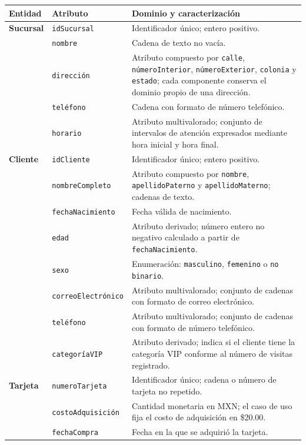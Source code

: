 \begin{center}
\footnotesize
\renewcommand{\arraystretch}{0.8}
\begin{tabularx}{\textwidth}{@{}>{\bfseries\color{unamblue}}p{}p{}X@{}}
\toprule
Entidad & Atributo & Dominio y caracterización \\
\midrule
Sucursal & \texttt{idSucursal} & Identificador único; entero positivo. \\
 & \texttt{nombre} & Cadena de texto no vacía. \\
 & \texttt{dirección} & Atributo compuesto por \texttt{calle},
   \texttt{númeroInterior}, \texttt{númeroExterior}, \texttt{colonia} y
   \texttt{estado}; cada componente conserva el dominio propio de una
   dirección. \\
 & \texttt{teléfono} & Cadena con formato de número telefónico. \\
 & \texttt{horario} & Atributo multivalorado; conjunto de intervalos de atención
   expresados mediante hora inicial y hora final. \\
\midrule
Cliente & \texttt{idCliente} & Identificador único; entero positivo. \\
 & \texttt{nombreCompleto} & Atributo compuesto por \texttt{nombre},
   \texttt{apellidoPaterno} y \texttt{apellidoMaterno}; cadenas de texto. \\
 & \texttt{fechaNacimiento} & Fecha válida de nacimiento. \\
 & \texttt{edad} & Atributo derivado; número entero no negativo calculado a
   partir de \texttt{fechaNacimiento}. \\
 & \texttt{sexo} & Enumeración: \texttt{masculino}, \texttt{femenino} o
   \texttt{no binario}. \\
 & \texttt{correoElectrónico} & Atributo multivalorado; conjunto de cadenas
   con formato de correo electrónico. \\
 & \texttt{teléfono} & Atributo multivalorado; conjunto de cadenas con formato
   de número telefónico. \\
 & \texttt{categoríaVIP} & Atributo derivado; indica si el cliente tiene la
   categoría VIP conforme al número de visitas registrado. \\
\midrule
Tarjeta & \texttt{numeroTarjeta} & Identificador único; cadena o número de
   tarjeta no repetido. \\
 & \texttt{costoAdquisición} & Cantidad monetaria en MXN; el caso de uso fija
   el costo de adquisición en \$20.00. \\
 & \texttt{fechaCompra} & Fecha en la que se adquirió la tarjeta. \\

\end{tabularx}
\end{center}
